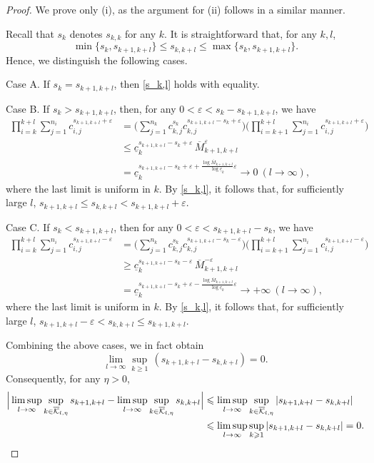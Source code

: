 \documentclass[12pt]{amsart}
\numberwithin{equation}{section}
\theoremstyle{plain}
\theoremstyle{remark}
\theoremstyle{definition}
\newcommand{\ok}{\overline{\mathcal{K}}}
\newcommand{\om}{\overline{M}}
\newcommand{\eps}{\varepsilon}
\newcommand{\f}{\frac}
\newcommand{\uc}{\underline{c}}
\renewcommand{\ge}{\geqslant}
\renewcommand{\le}{\leqslant}
\begin{document}
	\begin{proof}
We prove only (i), as the argument for (ii) follows in a similar manner.
		
	Recall that $s_k$ denotes $s_{k,k}$ for any $k$. It is straightforward that, for any $k,l$,
	\begin{equation}\label{s_k,l}
	\min\{s_{k},s_{k+1,k+l}\}\le	s_{k,k+l}\le \max\{s_{k},s_{k+1,k+l}\}.
	\end{equation}
	Hence, we distinguish the following cases.
	
	 Case A. If $s_{k}=s_{k+1,k+l}$, then \eqref{s_k,l} holds with equality.
	 
	 Case B. If $s_{k}>s_{k+1,k+l}$, then, for any $0<\eps<s_{k}-s_{k+1,k+l}$, we have
	 \begin{align*}
	 \prod_{i=k}^{k+l}\sum_{j=1}^{n_i}c_{i,j}^{s_{k+1,k+l}+\eps}&=\Big(\sum_{j=1}^{n_k}c_{k,j}^{s_{k}}c_{k,j}^{s_{k+1,k+l}-s_{k}+\eps}\Big)\Big(\prod_{i=k+1}^{k+l}\sum_{j=1}^{n_i}c_{i,j}^{s_{k+1,k+l}+\eps}\Big)\\
	 &\le\uc_k^{s_{k+1,k+l}-s_{k}+\eps}\,\om_{k+1,k+l}^\eps\\
	 &= \uc_k^{s_{k+1,k+l}-s_{k}+\eps+\f{\log \om_{k+1,k+l}}{\log \uc_k}\eps}\to 0\ (l\to\infty),
	 \end{align*}
	where the last limit is uniform in $k$. By \eqref{s_k,l}, it follows that, for sufficiently large $l$, $s_{k+1,k+l}\le s_{k,k+l}<s_{k+1,k+l}+\eps$.
	
	Case C. If $s_{k}<s_{k+1,k+l}$, then for any $0<\eps<s_{k+1,k+l}-s_{k}$, we have
	\begin{align*}
		\prod_{i=k}^{k+l}\sum_{j=1}^{n_i}c_{i,j}^{s_{k+1,k+l}-\eps}&=\Big(\sum_{j=1}^{n_k}c_{k,j}^{s_{k}}c_{k,j}^{s_{k+1,k+l}-s_{k}-\eps}\Big)\Big(\prod_{i=k+1}^{k+l}\sum_{j=1}^{n_i}c_{i,j}^{s_{k+1,k+l}-\eps}\Big)\\
		&\ge\uc_k^{s_{k+1,k+l}-s_{k}- \eps}\,\om_{k+1,k+l}^{-\eps}\\
		&=\uc_k^{s_{k+1,k+l}-s_{k}+\eps-\f{\log \om_{k+1,k+l}}{\log \uc_k}\eps}\to +\infty\ (l\to\infty),
	\end{align*}
	where the last limit is uniform in $k$. By \eqref{s_k,l}, it follows that, for sufficiently large $l$, $s_{k+1,k+l}-\eps< s_{k,k+l}\le s_{k+1,k+l}$.
	
	Combining  the above cases, we in fact obtain
	\[
	\lim_{l\to \infty}\sup_{k\ge 1}\,(s_{k+1,k+l}-s_{k,k+l})=0.
	\]
Consequently, for any $\eta>0$,
	\begin{align*}
		\Big|\limsup_{l\to \infty}\sup_{k\in \ok_{l,\eta}}s_{k+1,k+l}-\limsup_{l\to \infty}\sup_{k\in \ok_{l,\eta}}s_{k,k+l}\Big|&\le \limsup_{l\to \infty}\sup_{k\in \ok_{l,\eta}}|s_{k+1,k+l}-s_{k,k+l}|\\
		&\le \limsup_{l\to \infty}\sup_{k\ge 1}|s_{k+1,k+l}-s_{k,k+l}|=0.\qedhere
	\end{align*}
	\end{proof}
	
\end{document}
